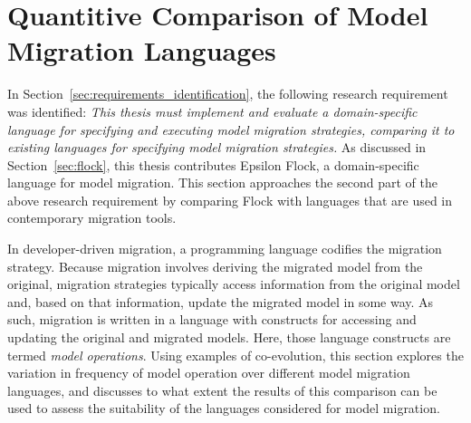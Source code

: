 
\section{Quantitive Comparison of Model Migration Languages}
\label{sec:quantitive}




In Section~\ref{sec:requirements_identification}, the following research requirement was identified: \emph{This thesis must implement and evaluate a domain-specific language for specifying and executing model migration strategies, comparing it to existing languages for specifying model migration strategies.} As discussed in Section~\ref{sec:flock}, this thesis contributes Epsilon Flock, a domain-specific language for model migration. This section approaches the second part of the above research requirement by comparing Flock with languages that are used in contemporary migration tools. 

In developer-driven migration, a programming language codifies the migration strategy. Because migration involves deriving the migrated model from the original, migration strategies typically access information from the original model and, based on that information, update the migrated model in some way. As such, migration is written in a language with constructs for accessing and updating the original and migrated models. Here, those language constructs are termed \textit{model operations}. Using examples of co-evolution, this section explores the variation in frequency of model operation over different model migration languages, and discusses to what extent the results of this comparison can be used to assess the suitability of the languages considered for model migration.

